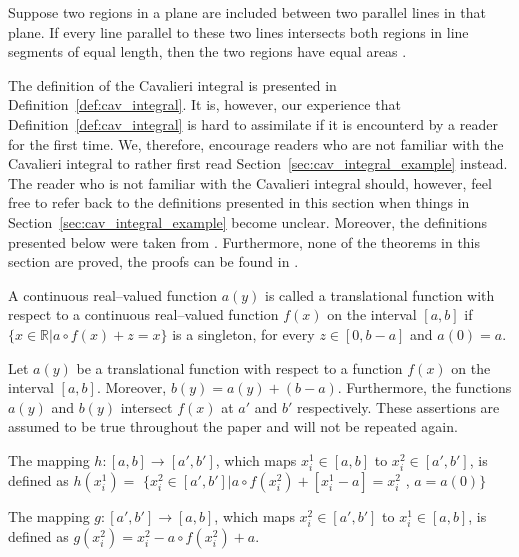 \documentclass[twoside,reqno,11pt]{fcaa-var} %
\begin{document}
\begin{theorem}
Suppose two regions in a plane are included between two parallel lines in that plane. If every line parallel to these two lines intersects both regions in line segments of equal length, then the two regions have equal areas \cite{ackermann12}. 
\end{theorem}

\noindent
The definition of the Cavalieri integral is presented in Definition~\ref{def:cav_integral}. It is, however, our experience that Definition~\ref{def:cav_integral} is hard to assimilate if it is encounterd by a reader for the first time. We, therefore, encourage readers who are not familiar with the Cavalieri integral to rather first read Section~\ref{sec:cav_integral_example} instead. The reader who is not familiar with the Cavalieri integral should, however, feel free to refer back to the definitions presented in this section when things in Section~\ref{sec:cav_integral_example} become unclear. Moreover, the definitions presented below were taken from \cite{ackermann12}. Furthermore, none of the theorems in this section are proved, the proofs can be found in \cite{ackermann12,grobler19}.

\begin{definition}\label{def:trans}
A continuous real--valued function $a(y)$ is called a translational function with respect to a continuous real--valued function $f(x)$ on the interval $[a,b]$ if 
$\{x\in\mathbb{R}|a\circ f(x) + z = x\}$ is a singleton, for every $z\in[0,b-a]$ and $a(0) = a$.
\end{definition}

\noindent
Let $a(y)$ be a translational function with respect to a function $f(x)$ on the interval $[a,b]$. Moreover, $b(y) = a(y) + (b-a)$. Furthermore, the functions $a(y)$ and $b(y)$ intersect $f(x)$ at $a'$ and $b'$ respectively. These assertions are assumed to be true throughout the paper and will not be repeated again.

\begin{definition}\label{def:h}
The mapping $h : [a, b] \rightarrow [a',b']$, which maps $x_i^1 \in [a, b]$ to $x_i^2 \in [a',b']$, is defined as
$h(x_i^1) =$ $\{x_i^2 \in [a' ,b'] | a\circ f(x_i^2) + [x_i^1 - a] = x_i^2$ , $a = a(0)\}$
\end{definition}

\begin{definition}\label{def:g}
The mapping $g:[a', b'] \rightarrow [a, b]$, which maps $x_i^2 \in [a' , b']$ to $x_i^1\in [a, b]$,
is defined as $g(x_i^2) = x_i^2 - a \circ f (x_i^2) + a$.
\end{definition}
\end{document}
